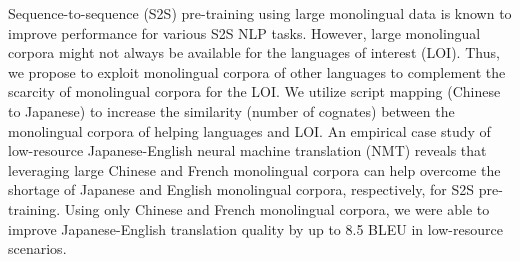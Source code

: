 Sequence-to-sequence (S2S) pre-training using large monolingual data is known to improve performance for various S2S NLP tasks. However, large monolingual corpora might not always be available for the languages of interest (LOI). Thus, we propose to exploit monolingual corpora of other languages to complement the scarcity of monolingual corpora for the LOI. We utilize script mapping (Chinese to Japanese) to increase the similarity (number of cognates) between the monolingual corpora of helping languages and LOI. An empirical case study of low-resource Japanese-English neural machine translation (NMT) reveals that leveraging large Chinese and French monolingual corpora can help overcome the shortage of Japanese and English monolingual corpora, respectively, for S2S pre-training. Using only Chinese and French monolingual corpora, we were able to improve Japanese-English translation quality by up to 8.5 BLEU in low-resource scenarios.
